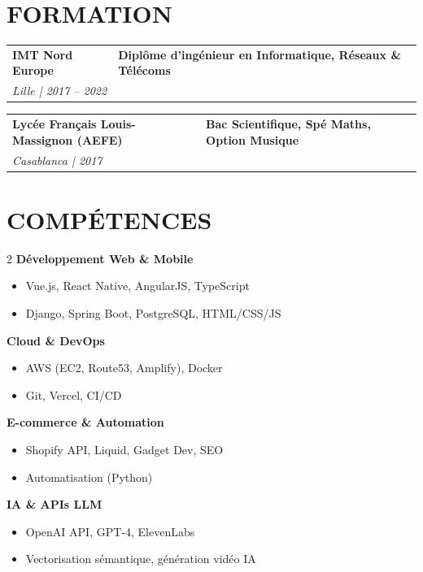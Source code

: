 \documentclass[a4paper,11pt]{article}
\begin{document}
\vspace{0.3cm}

\section{FORMATION}

\begin{tabularx}{\textwidth}{@{}l X@{}}
\textbf{IMT Nord Europe} & \textbf{Diplôme d'ingénieur en Informatique, Réseaux \& Télécoms} \\
\textit{Lille | 2017 – 2022} & \\
\end{tabularx}

\vspace{0.1cm}

\begin{tabularx}{\textwidth}{@{}l X@{}}
\textbf{Lycée Français Louis-Massignon (AEFE)} & \textbf{Bac Scientifique, Spé Maths, Option Musique} \\
\textit{Casablanca | 2017} & \\
\end{tabularx}

\newpage

\section{COMPÉTENCES}

\begin{multicols}{2}
\textbf{Développement Web \& Mobile}
\begin{itemize}[nosep]
    \item Vue.js, React Native, AngularJS, TypeScript
    \item Django, Spring Boot, PostgreSQL, HTML/CSS/JS
\end{itemize}

\textbf{Cloud \& DevOps}
\begin{itemize}[nosep]
    \item AWS (EC2, Route53, Amplify), Docker
    \item Git, Vercel, CI/CD
\end{itemize}

\columnbreak

\textbf{E-commerce \& Automation}
\begin{itemize}[nosep]
    \item Shopify API, Liquid, Gadget Dev, SEO
    \item Automatisation (Python)
\end{itemize}

\textbf{IA \& APIs LLM}
\begin{itemize}[nosep]
    \item OpenAI API, GPT-4, ElevenLabs
    \item Vectorisation sémantique, génération vidéo IA
\end{itemize}
\end{multicols}
\end{document}
